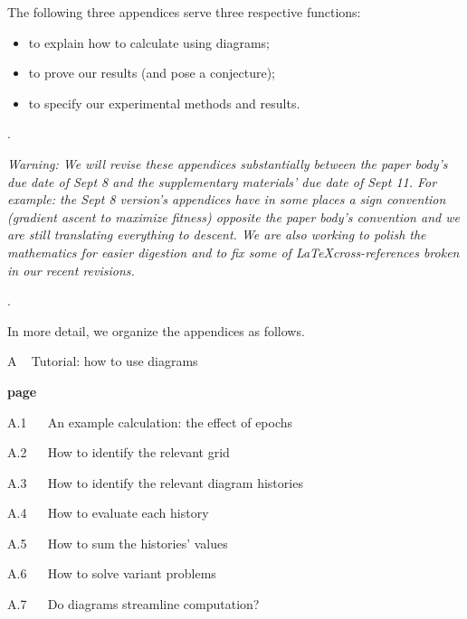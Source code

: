         The following three appendices serve three respective functions:
        \begin{itemize}[noitemsep]
            \item to explain how to calculate using diagrams;
            \item to prove our results (and pose a conjecture);
            \item to specify our experimental methods and results.
        \end{itemize}

        .

        \emph{{\color{moor!90}Warning}:
        We will revise these appendices substantially between the paper body's
        due date of Sept 8 and the supplementary materials' due date of Sept
        11.  For example: the Sept 8 version's appendices have in some places
        a sign convention (gradient \emph{ascent} to maximize fitness) opposite
        the paper body's convention and we are still translating everything to
        \emph{descent}.  We are also working to polish the mathematics
        for easier digestion and to fix some of \LaTeX cross-references
        broken in our recent revisions.
        }

        .

        In more detail, we organize the appendices as follows.\\
    
        {\bf
        \par\noindent A ~ Tutorial: how to use diagrams}                        \hfill {\bf page \pageref{appendix:tutorial}}
        \par\indent     A.1 ~~ An example calculation: the effect of epochs     \hfill \pageref{appendix:example}
        \par\indent     A.2 ~~ How to identify the relevant grid                \hfill \pageref{appendix:draw-spacetime} 
        \par\indent     A.3 ~~ How to identify the relevant diagram histories  \hfill \pageref{appendix:draw-histories}
        \par\indent     A.4 ~~ How to evaluate each history                   \hfill \pageref{appendix:evaluate-histories}
        \par\indent     A.5 ~~ How to sum the histories' values                \hfill \pageref{appendix:sum-histories}
        \par\indent     A.6 ~~ How to solve variant problems                    \hfill \pageref{appendix:solve-variants}
        \par\indent     A.7 ~~ Do diagrams streamline computation?              \hfill \pageref{appendix:diagrams-streamline}
    
